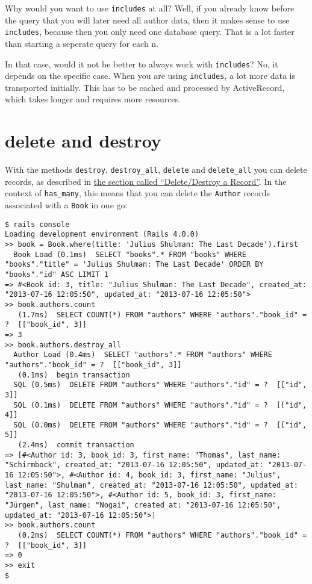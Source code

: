 \documentclass[a4paper]{book}
\newcounter{tab}[chapter]
\begin{document}
Why would you want to use \texttt{includes} at all? Well, if you already know before the query that you will later need all author data, then it makes sense to use \texttt{includes}, because then you only need one database query. That is a lot faster than starting a seperate query for each n.

In that case, would it not be better to always work with \texttt{includes}? No, it depends on the specific case. When you are using \texttt{includes}, a lot more data is transported initially. This has to be cached and processed by ActiveRecord, which takes longer and requires more resources.

\section{delete and destroy}\label{delete-and-destroy}

With the methods \texttt{destroy}, \texttt{destroy\_all}, \texttt{delete} and \texttt{delete\_all} you can delete records, as described in \hyperref[datensatz-loeschen]{the section called “Delete/Destroy a Record”}. In the context of \texttt{has\_many}, this means that you can delete the \texttt{Author} records associated with a \texttt{Book} in one go:

\begin{shaded}\begin{verbatim}
$ rails console
Loading development environment (Rails 4.0.0)
>> book = Book.where(title: 'Julius Shulman: The Last Decade').first
  Book Load (0.1ms)  SELECT "books".* FROM "books" WHERE "books"."title" = 'Julius Shulman: The Last Decade' ORDER BY "books"."id" ASC LIMIT 1
=> #<Book id: 3, title: "Julius Shulman: The Last Decade", created_at: "2013-07-16 12:05:50", updated_at: "2013-07-16 12:05:50">
>> book.authors.count
   (1.7ms)  SELECT COUNT(*) FROM "authors" WHERE "authors"."book_id" = ?  [["book_id", 3]]
=> 3
>> book.authors.destroy_all
  Author Load (0.4ms)  SELECT "authors".* FROM "authors" WHERE "authors"."book_id" = ?  [["book_id", 3]]
   (0.1ms)  begin transaction
  SQL (0.5ms)  DELETE FROM "authors" WHERE "authors"."id" = ?  [["id", 3]]
  SQL (0.1ms)  DELETE FROM "authors" WHERE "authors"."id" = ?  [["id", 4]]
  SQL (0.0ms)  DELETE FROM "authors" WHERE "authors"."id" = ?  [["id", 5]]
   (2.4ms)  commit transaction
=> [#<Author id: 3, book_id: 3, first_name: "Thomas", last_name: "Schirmbock", created_at: "2013-07-16 12:05:50", updated_at: "2013-07-16 12:05:50">, #<Author id: 4, book_id: 3, first_name: "Julius", last_name: "Shulman", created_at: "2013-07-16 12:05:50", updated_at: "2013-07-16 12:05:50">, #<Author id: 5, book_id: 3, first_name: "Jürgen", last_name: "Nogai", created_at: "2013-07-16 12:05:50", updated_at: "2013-07-16 12:05:50">]
>> book.authors.count
   (0.2ms)  SELECT COUNT(*) FROM "authors" WHERE "authors"."book_id" = ?  [["book_id", 3]]
=> 0
>> exit
$
\end{verbatim}\end{shaded}
\end{document}
